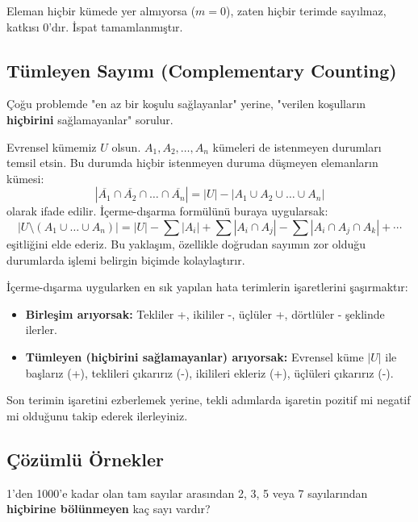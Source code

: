 Eleman hiçbir kümede yer almıyorsa ($m=0$), zaten hiçbir terimde sayılmaz,
katkısı 0'dır. İspat tamamlanmıştır.

\subsection{Tümleyen Sayımı (Complementary Counting)}

Çoğu problemde "en az bir koşulu sağlayanlar" yerine, "verilen koşulların
\textbf{hiçbirini} sağlamayanlar" sorulur.

Evrensel kümemiz $U$ olsun. $A_1, A_2, \dots, A_n$ kümeleri de istenmeyen
durumları temsil etsin. Bu durumda hiçbir istenmeyen duruma düşmeyen
elemanların kümesi: \[ |\overline{A_1} \cap \overline{A_2} \cap \dots \cap
\overline{A_n}| = |U| - |A_1 \cup A_2 \cup \dots \cup A_n| \] olarak ifade
edilir. İçerme-dışarma formülünü buraya uygularsak: \[ |U \setminus (A_1 \cup
\dots \cup A_n)| = |U| - \sum |A_i| + \sum |A_i \cap A_j| - \sum |A_i \cap A_j
\cap A_k| + \cdots \] eşitliğini elde ederiz. Bu yaklaşım, özellikle doğrudan
sayımın zor olduğu durumlarda işlemi belirgin biçimde kolaylaştırır.

\begin{definition} İçerme-dışarma uygularken en sık yapılan
hata terimlerin işaretlerini şaşırmaktır: \begin{itemize} \item \textbf{Birleşim
arıyorsak:} Tekliler +, ikililer -, üçlüler +, dörtlüler - şeklinde ilerler.
\item \textbf{Tümleyen (hiçbirini sağlamayanlar) arıyorsak:} Evrensel küme $|U|$
ile başlarız (+), teklileri çıkarırız (-), ikilileri ekleriz (+), üçlüleri
çıkarırız (-). \end{itemize} Son terimin işaretini ezberlemek yerine, tekli
adımlarda işaretin pozitif mi negatif mi olduğunu takip ederek ilerleyiniz.
\end{definition}

\subsection{Çözümlü Örnekler}

\begin{example} 1'den 1000'e kadar olan tam sayılar arasından 2, 3, 5 veya 7
sayılarından \textbf{hiçbirine bölünmeyen} kaç sayı vardır? \end{example}

